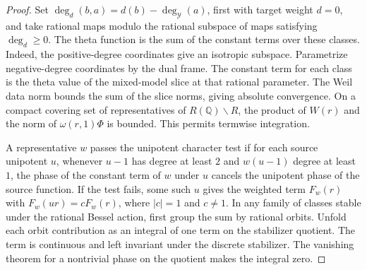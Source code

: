 \begin{proof}
Set $\deg_d(b,a)=d(b)-\deg_{\mathcal Y}(a)$, first with target weight $d=0$, and take rational maps modulo the rational subspace of maps satisfying $\deg_d\ge0$. The theta function is the sum of the constant terms over these classes. Indeed, the positive-degree coordinates give an isotropic subspace. Parametrize negative-degree coordinates by the dual frame. The constant term for each class is the theta value of the mixed-model slice at that rational parameter. The Weil data norm bounds the sum of the slice norms, giving absolute convergence. On a compact covering set of representatives of $R(\mathbb Q)\backslash R$, the product of $W(r)$ and the norm of $\omega(r,1)\Phi$ is bounded. This permits termwise integration.

A representative $w$ passes the unipotent character test if for each source unipotent $u$, whenever $u-1$ has degree at least $2$ and $w(u-1)$ degree at least $1$, the phase of the constant term of $w$ under $u$ cancels the unipotent phase of the source function. If the test fails, some such $u$ gives the weighted term $F_w(r)$ with $F_w(ur)=cF_w(r)$, where $|c|=1$ and $c\ne1$. In any family of classes stable under the rational Bessel action, first group the sum by rational orbits. Unfold each orbit contribution as an integral of one term on the stabilizer quotient. The term is continuous and left invariant under the discrete stabilizer. The vanishing theorem for a nontrivial phase on the quotient makes the integral zero.


\end{proof}
